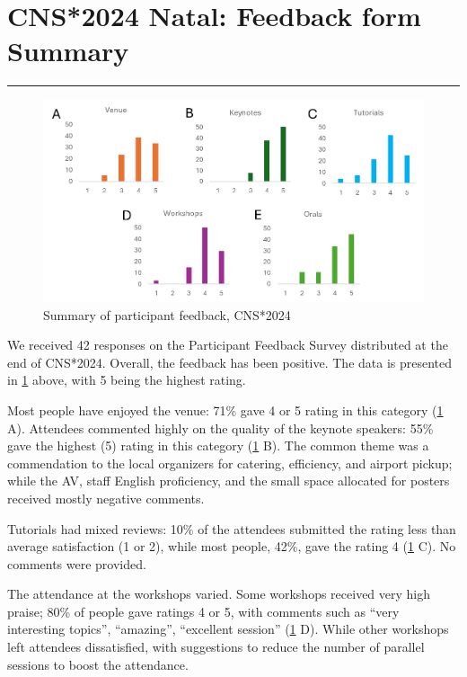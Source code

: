 \documentclass[11pt,a4paper,oneside]{article}
\begin{document}
\section*{CNS*2024 Natal: Feedback form Summary}%
\rule{\textwidth}{0.4pt}
\begin{figure}[h]
  \centering
  \includegraphics[width=\textwidth]{images/cns2024-feedback-form-summary}
  \caption{Summary of participant feedback, CNS*2024}%
  \label{fig:cns2024-summary}
\end{figure}

\noindent{}We received 42 responses on the Participant Feedback Survey distributed at the end of CNS*2024.
Overall, the feedback has been positive. The data is presented in \cref{fig:cns2024-summary} above, with 5 being the highest rating.

Most people have enjoyed the venue: 71\% gave 4 or 5 rating in this category (\cref{fig:cns2024-summary} A).
Attendees commented highly on the quality of the keynote speakers: 55\% gave the highest (5) rating in this category (\cref{fig:cns2024-summary} B).
The common theme was a commendation to the local organizers for catering, efficiency, and airport pickup; while the AV, staff English proficiency, and the small space allocated for posters received mostly negative comments.

Tutorials had mixed reviews: 10\% of the attendees submitted the rating less than average satisfaction (1 or 2), while most people, 42\%, gave the rating 4 (\cref{fig:cns2024-summary} C). No comments were provided.

The attendance at the workshops varied.
Some workshops received very high praise; 80\% of people gave ratings 4 or 5, with comments such as \enquote{very interesting topics}, \enquote{amazing}, \enquote{excellent session} (\cref{fig:cns2024-summary} D).
While other workshops left attendees dissatisfied, with suggestions to reduce the number of parallel sessions to boost the attendance.
\end{document}
